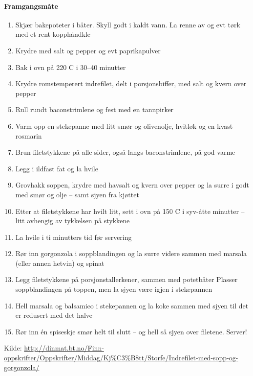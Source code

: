 \paragraph{Framgangsmåte}
\begin{enumerate}[noitemsep]
	\item Skjær bakepoteter i båter. Skyll godt i kaldt vann. La renne av og evt tørk med et rent kopphåndkle
	\item Krydre med salt og pepper og evt paprikapulver
	\item Bak i ovn på 220 \degree C i 30--40 minutter
	\item Krydre romstemperert indrefilet, delt i porsjonsbiffer, med salt og kvern over pepper
	\item Rull rundt baconstrimlene og fest med en tannpirker
	\item Varm opp en stekepanne med litt smør og olivenolje, hvitløk og en kvast rosmarin
	\item Brun filetstykkene på alle sider, også langs baconstrimlene, på god varme
	\item Legg i ildfast fat og la hvile
	\item Grovhakk soppen, krydre med havsalt og kvern over pepper og la surre i godt med smør og olje – samt sjyen fra kjøttet
	\item Etter at filetstykkene har hvilt litt, sett i ovn på 150 \degree C i syv-åtte minutter – litt avhengig av tykkelsen på stykkene
	\item La hvile i ti minutters tid før servering
	\item Rør inn gorgonzola i soppblandingen og la surre videre sammen med marsala (eller annen hetvin) og spinat
	\item Legg filetstykkene på porsjonstallerkener, sammen med potetbåter Plasser soppblandingen på toppen, men la sjyen være igjen i stekepannen
	\item Hell marsala og balsamico i stekepannen og la koke sammen med sjyen til det er redusert med det halve
	\item Rør inn én spiseskje smør helt til slutt – og hell så sjyen over filetene. Server!
\end{enumerate}


Kilde: \url{http://dinmat.bt.no/Finn-oppskrifter/Oppskrifter/Middag/Kj%C3%B8tt/Storfe/Indrefilet-med-sopp-og-gorgonzola/}
